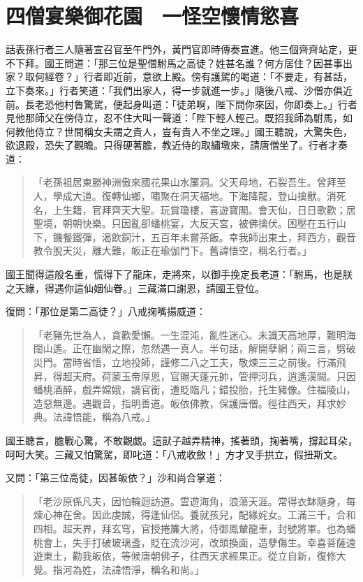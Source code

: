 
\chapter{四僧宴樂御花園　一怪空懷情慾喜}

話表孫行者三人隨著宣召官至午門外，黃門官即時傳奏宣進。他三個齊齊站定，更不下拜。國王問道：「那三位是聖僧駙馬之高徒？姓甚名誰？何方居住？因甚事出家？取何經卷？」行者即近前，意欲上殿。傍有護駕的喝道：「不要走，有甚話，立下奏來。」行者笑道：「我們出家人，得一步就進一步。」隨後八戒、沙僧亦俱近前。長老恐他村魯驚駕，便起身叫道：「徒弟啊，陛下問你來因，你即奏上。」行者見他那師父在傍侍立，忍不住大叫一聲道：「陛下輕人輕己。既招我師為駙馬，如何教他侍立？世間稱女夫謂之貴人，豈有貴人不坐之理。」國王聽說，大驚失色，欲退殿，恐失了觀瞻。只得硬著膽，教近侍的取繡墩來，請唐僧坐了。行者才奏道：
\begin{quote}
「老孫祖居東勝神洲傲來國花果山水簾洞。父天母地，石裂吾生。曾拜至人，學成大道。復轉仙鄉，嘯聚在洞天福地。下海降龍，登山擒獸。消死名，上生籍，官拜齊天大聖。玩賞瓊樓，喜遊寶閣。會天仙，日日歌歡；居聖境，朝朝快樂。只因亂卻蟠桃宴，大反天宮，被佛擒伏。困壓在五行山下，饑餐鐵彈，渴飲銅汁，五百年未嘗茶飯。幸我師出東土，拜西方，觀音教令脫天災，離大難，皈正在瑜伽門下。舊諱悟空，稱名行者。」
\end{quote}

國王聞得這般名重，慌得下了龍床，走將來，以御手挽定長老道：「駙馬，也是朕之天緣，得遇你這仙姻仙眷。」三藏滿口謝恩，請國王登位。

復問：「那位是第二高徒？」八戒掬嘴揚威道：
\begin{quote}
「老豬先世為人，貪歡愛懶。一生混沌，亂性迷心。未識天高地厚，難明海闊山遙。正在幽閑之際，忽然遇一真人。半句話，解開孽網；兩三言，劈破災門。當時省悟，立地投師，謹修二八之工夫，敬煉三三之前後。行滿飛昇，得超天府。荷蒙玉帝厚恩，官賜天蓬元帥，管押河兵，逍遙漢闕。只因蟠桃酒醉，戲弄嫦娥，謫官銜，遭貶臨凡；錯投胎，托生豬像。住福陵山，造惡無邊。遇觀音，指明善道。皈依佛教，保護唐僧。徑往西天，拜求妙典。法諱悟能，稱為八戒。」
\end{quote}

國王聽言，膽戰心驚，不敢觀覷。這獃子越弄精神，搖著頭，掬著嘴，撐起耳朵，呵呵大笑。三藏又怕驚駕，即叱道：「八戒收斂！」方才叉手拱立，假扭斯文。

又問：「第三位高徒，因甚皈依？」沙和尚合掌道：
\begin{quote}
「老沙原係凡夫，因怕輪迴訪道。雲遊海角，浪蕩天涯。常得衣缽隨身，每煉心神在舍。因此虔誠，得逢仙侶。養就孩兒，配緣姹女。工滿三千，合和四相。超天界，拜玄穹，官授捲簾大將，侍御鳳輦龍車，封號將軍。也為蟠桃會上，失手打破玻璃盞，貶在流沙河，改頭換面，造孽傷生。幸喜菩薩遠遊東土，勸我皈依，等候唐朝佛子，往西天求經果正。從立自新，復修大覺。指河為姓，法諱悟淨，稱名和尚。」
\end{quote}

